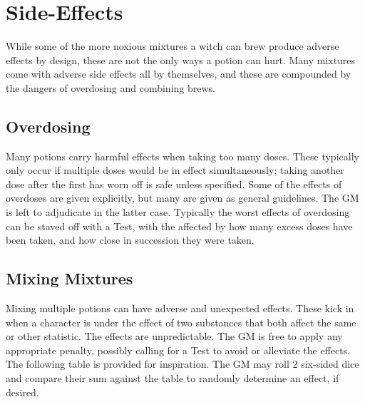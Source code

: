 \section{Side-Effects}

While some of the more noxious mixtures a witch can brew produce adverse effects by design, these are not the only ways a potion can hurt.
Many mixtures come with adverse side effects all by themselves, and these are compounded by the dangers of overdosing and combining brews.

\subsection{Overdosing}

Many potions carry harmful effects when taking too many doses.
These typically only occur if multiple doses would be in effect simultaneously; taking another dose after the first has worn off is safe unless specified.
Some of the effects of overdoses are given explicitly, but many are given as general guidelines.
The GM is left to adjudicate in the latter case.
Typically the worst effects of overdosing can be staved off with a  Test, with the {\tn} affected by how many excess doses have been taken, and how close in succession they were taken.

\subsection{Mixing Mixtures}

Mixing multiple potions can have adverse and unexpected effects.
These kick in when a character is under the effect of two substances that both affect the same  or other statistic.
The effects are unpredictable.
The GM is free to apply any appropriate penalty, possibly calling for a  Test to avoid or alleviate the effects.
The following table is provided for inspiration.
The GM may roll 2 six-sided dice and compare their sum against the table to randomly determine an effect, if desired.


